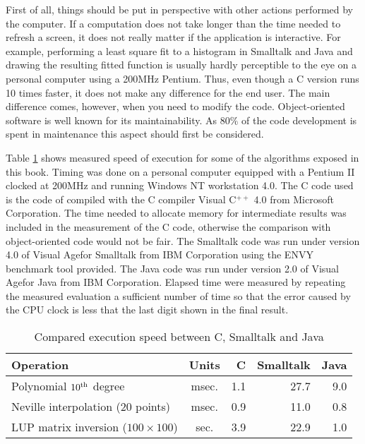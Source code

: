 \documentclass[twoside]{book}
\begin{document}
First of all, things should be put in perspective with other
actions performed by the computer. If a computation does not take
longer than the time needed to refresh a screen, it does not
really matter if the application is interactive. For example,
performing a least square fit to a histogram in Smalltalk and Java
and drawing the resulting fitted function is usually hardly
perceptible to the eye on a personal computer using a 200MHz
Pentium. Thus, even though a C version runs 10 times faster, it
does not make any difference for the end user. The main difference
comes, however, when you need to modify the code. Object-oriented
software is well known for its maintainability. As $80\%$ of the
code development is spent in maintenance this aspect should first
be considered.

Table \ref{tb:speed} shows measured speed of execution for some of
the algorithms exposed in this book. Timing was done on a personal
computer equipped with a Pentium II clocked at 200MHz and running
Windows NT workstation 4.0. The C code used is the code of
\cite{Press} compiled with the C compiler Visual C$^{++}$ 4.0 from
Microsoft Corporation. The time needed to allocate memory for
intermediate results was included in the measurement of the C
code, otherwise the comparison with object-oriented code would not
be fair. The Smalltalk code was run under version 4.0 of Visual
Age\tm for Smalltalk from IBM Corporation using the ENVY benchmark
tool provided. The Java code was run under version 2.0 of Visual
Age\tm for Java from IBM Corporation. Elapsed time were measured
by repeating the measured evaluation a sufficient number of time
so that the error caused by the CPU clock is less that the last
digit shown in the final result.
\begin{table}[h]
\caption{Compared execution speed between C, Smalltalk and Java}
\label{tb:speed} \vspace{1 ex}
\begin{tabular}{|l | c r r r|} \hline
  \hfil {\bf Operation} & {\bf Units} & {\bf C}\hfil & {\bf Smalltalk}\hfil & {\bf Java}\hfil \\ \hline
  Polynomial $10^{\mathop{\rm th}}$ degree & msec. & 1.1 & 27.7 & 9.0 \\
  Neville interpolation (20 points) & msec. & 0.9 & 11.0 & 0.8 \\
  LUP matrix inversion ($100\times 100$)& sec. & 3.9 & 22.9 & 1.0 \\ \hline
\end{tabular}
\end{table}
\end{document}
